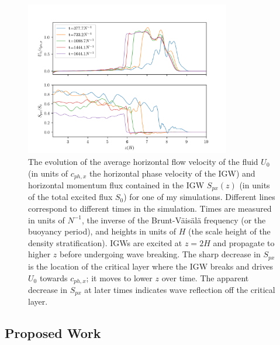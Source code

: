 \documentclass[12pt,
        usenames, %
        dvipsnames %
    ]{article}
\begin{document}
\begin{figure}[!h]
    \centering
    \includegraphics[width=0.8\textwidth]{nl_fluxes.png}
    \caption{The evolution of the average horizontal flow velocity of the fluid
    $U_0$ (in units of $c_{ph,x}$ the horizontal phase velocity of the IGW) and
    horizontal momentum flux contained in the IGW $S_{px}(z)$ (in units of the
    total excited flux $S_0$) for one of my simulations. Different lines
    correspond to different times in the simulation. Times are measured in units
    of $N^{-1}$, the inverse of the Brunt-V\"ais\"al\"a frequency (or the
    buoyancy period), and heights in units of $H$ (the scale height of the
    density stratification). IGWs are excited at $z = 2H$ and propagate to
    higher $z$ before undergoing wave breaking. The sharp decrease in $S_{px}$
    is the location of the critical layer where the IGW breaks and drives $U_0$
    towards $c_{ph, x}$; it moves to lower $z$ over time. The apparent decrease
    in $S_{px}$ at later times indicates wave reflection off the critical
    layer.}\label{fig:nl_fluxes}
\end{figure}

\subsection{Proposed Work}
\end{document}
